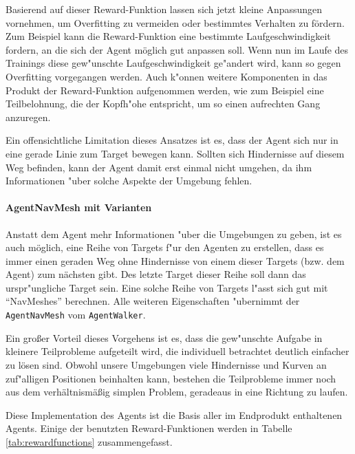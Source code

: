 Basierend auf dieser Reward-Funktion lassen sich jetzt kleine Anpassungen vornehmen, um Overfitting zu vermeiden oder bestimmtes Verhalten zu fördern. Zum Beispiel kann die Reward-Funktion eine bestimmte Laufgeschwindigkeit fordern, an die sich der Agent möglich gut anpassen soll. Wenn nun im Laufe des Trainings diese gew"unschte Laufgeschwindigkeit ge"andert wird, kann so gegen Overfitting vorgegangen werden. Auch k"onnen weitere Komponenten in das Produkt der Reward-Funktion aufgenommen werden, wie zum Beispiel eine Teilbelohnung, die der Kopfh"ohe entspricht, um so einen aufrechten Gang anzuregen.

Ein offensichtliche Limitation dieses Ansatzes ist es, dass der Agent sich nur in eine gerade Linie zum Target bewegen kann. Sollten sich Hindernisse auf diesem Weg befinden, kann der Agent damit erst einmal nicht umgehen, da ihm Informationen "uber solche Aspekte der Umgebung fehlen.

\paragraph{AgentNavMesh mit Varianten}
\label{subsubsec:agentnavmesh}

Anstatt dem Agent mehr Informationen "uber die Umgebungen zu geben, ist es auch möglich, eine Reihe von Targets f"ur den Agenten zu erstellen, dass es immer einen geraden Weg ohne Hindernisse von einem dieser Targets (bzw. dem Agent) zum nächsten gibt. Des letzte Target dieser Reihe soll dann das urspr"ungliche Target sein. Eine solche Reihe von Targets l"asst sich gut mit \enquote{NavMeshes} berechnen. Alle weiteren Eigenschaften "ubernimmt der \texttt{AgentNavMesh} vom \texttt{AgentWalker}.

Ein großer Vorteil dieses Vorgehens ist es, dass die gew"unschte Aufgabe in kleinere Teilprobleme aufgeteilt wird, die individuell betrachtet deutlich einfacher zu lösen sind. Obwohl unsere Umgebungen viele Hindernisse und Kurven an zuf"alligen Positionen beinhalten kann, bestehen die Teilprobleme immer noch aus dem verhältnismäßig simplen Problem, geradeaus in eine Richtung zu laufen.

Diese Implementation des Agents ist die Basis aller im Endprodukt enthaltenen Agents. Einige der benutzten Reward-Funktionen werden in Tabelle \ref{tab:rewardfunctions} zusammengefasst.

